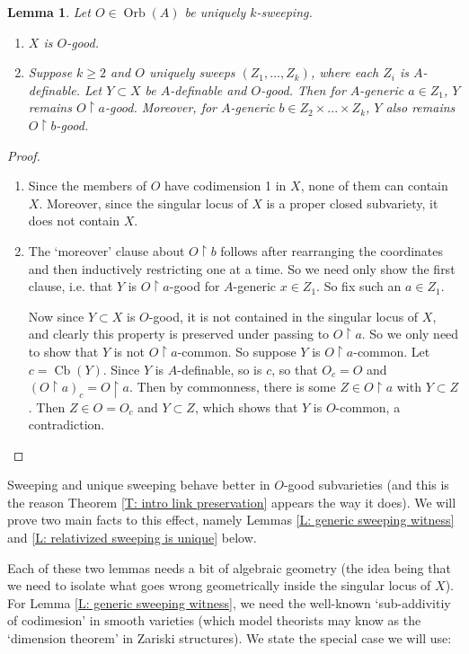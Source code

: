 \documentclass{amsart}
\newtheorem{lemma}[theorem]{Lemma}
\theoremstyle{definition}
\begin{document}
\begin{lemma}\label{L: good preservation}
    Let $O\in\operatorname{Orb}(A)$ be uniquely $k$-sweeping.
    \begin{enumerate}
        \item $X$ is $O$-good.
        \item Suppose $k\geq 2$ and $O$ uniquely sweeps $(Z_1,...,Z_k)$, where each $Z_i$ is $A$-definable. Let $Y\subset X$ be $A$-definable and $O$-good. Then for $A$-generic $a\in Z_1$, $Y$ remains $O\restriction a$-good. Moreover, for $A$-generic $b\in Z_2\times...\times Z_k$, $Y$ also remains $O\restriction b$-good.
        
    \end{enumerate}
\end{lemma}
\begin{proof}
    \begin{enumerate}
        \item Since the members of $O$ have codimension 1 in $X$, none of them can contain $X$. Moreover, since the singular locus of $X$ is a proper closed subvariety, it does not contain $X$. 
        \item The `moreover' clause about $O\restriction b$ follows after rearranging the coordinates and then inductively restricting one at a time. So we need only show the first clause, i.e. that $Y$ is $O\restriction a$-good for $A$-generic $x\in Z_1$. So fix such an $a\in Z_1$.
        
        Now since $Y\subset X$ is $O$-good, it is not contained in the singular locus of $X$, and clearly this property is preserved under passing to $O\restriction a$. So we only need to show that $Y$ is not $O\restriction a$-common. So suppose $Y$ is $O\restriction a$-common. Let $c=\operatorname{Cb}(Y)$. Since $Y$ is $A$-definable, so is $c$, so that $O_c=O$ and $(O\restriction a)_c=O\restriction a$. Then by commonness, there is some $Z\in O\restriction a$ with $Y\subset Z$. Then $Z\in O=O_c$ and $Y\subset Z$, which shows that $Y$ is $O$-common, a contradiction.  
    \end{enumerate}
\end{proof}

Sweeping and unique sweeping behave better in $O$-good subvarieties (and this is the reason Theorem \ref{T: intro link preservation} appears the way it does). We will prove two main facts to this effect, namely Lemmas \ref{L: generic sweeping witness} and \ref{L: relativized sweeping is unique} below. 

Each of these two lemmas needs a bit of algebraic geometry (the idea being that we need to isolate what goes wrong geometrically inside the singular locus of $X$). For Lemma \ref{L: generic sweeping witness}, we need the well-known `sub-addivitiy of codimesion' in smooth varieties (which model theorists may know as the `dimension theorem' in Zariski structures). We state the special case we will use:
\end{document}
